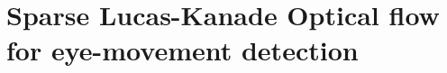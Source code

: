 \documentclass[Bachelorarbeit.tex]{subfiles}
\begin{document}
\newpage
\section{Sparse Lucas-Kanade Optical flow for eye-movement detection}
\label{Sparse Lucas-Kanade Optical flow for eye-movement detection}

\FloatBarrier
\end{document}
